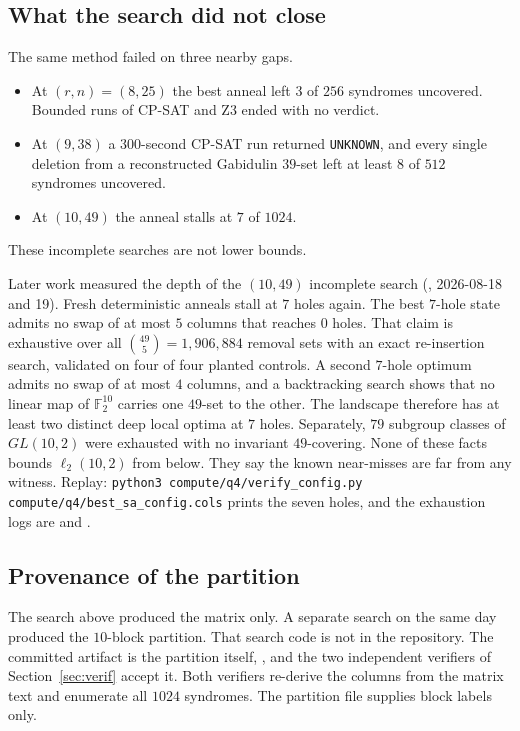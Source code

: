 \documentclass[11pt,a4paper]{article}
\newcommand{\FF}{\mathbb{F}}
\newcommand{\ellr}{\ell_2}
\theoremstyle{remark}
\begin{document}
\subsection{What the search did not close}

The same method failed on three nearby gaps.
\begin{itemize}
\item At $(r,n)=(8,25)$ the best anneal left $3$ of $256$ syndromes
uncovered. Bounded runs of CP-SAT and Z3 ended with no verdict.
\item At $(9,38)$ a $300$-second CP-SAT run returned \texttt{UNKNOWN},
and every single deletion from a reconstructed Gabidulin $39$-set left
at least $8$ of $512$ syndromes uncovered.
\item At $(10,49)$ the anneal stalls at $7$ of $1024$.
\end{itemize}
These incomplete searches are not lower bounds.

Later work measured the depth of the $(10,49)$ incomplete search
(, 2026-08-18 and 19). Fresh deterministic anneals
stall at $7$ holes again. The best $7$-hole state admits no swap of at
most $5$ columns that reaches $0$ holes. That claim is exhaustive over
all $\binom{49}{5}=1{,}906{,}884$ removal sets with an exact
re-insertion search, validated on four of four planted controls. A
second $7$-hole optimum admits no swap of at most $4$ columns, and a
backtracking search shows that no linear map of $\FF_2^{10}$ carries
one $49$-set to the other. The landscape therefore has at least two
distinct deep local optima at $7$ holes. Separately, $79$ subgroup
classes of $GL(10,2)$ were exhausted with no invariant $49$-covering.
None of these facts bounds $\ellr(10,2)$ from below. They say the known
near-misses are far from any witness. Replay:
\texttt{python3 compute/q4/verify\_config.py
compute/q4/best\_sa\_config.cols} prints the seven holes, and the
exhaustion logs are  and
.

\subsection{Provenance of the partition}

The search above produced the matrix only. A separate search on the
same day produced the $10$-block partition. That search code is not in
the repository. The committed artifact is the partition itself,
, and the two independent
verifiers of Section~\ref{sec:verif} accept it. Both verifiers
re-derive the columns from the matrix text and enumerate all $1024$
syndromes. The partition file supplies block labels only.
\end{document}
